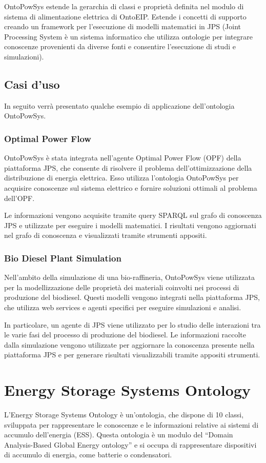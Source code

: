 OntoPowSys estende la gerarchia di classi e proprietà definita nel modulo di
sistema di alimentazione elettrica di OntoEIP. Estende
i concetti di supporto creando un framework per l'esecuzione di modelli
matematici in JPS (Joint Processing System è un sistema informatico che
utilizza ontologie per integrare conoscenze provenienti da diverse fonti e
consentire l'esecuzione di studi e simulazioni).

\subsection{Casi d'uso}
In seguito verrà presentato qualche esempio di applicazione dell'ontologia
OntoPowSys.

\subsubsection{Optimal Power Flow}
OntoPowSys è stata integrata nell'agente Optimal Power Flow (OPF) della
piattaforma JPS, che consente di risolvere il problema dell'ottimizzazione
della distribuzione di energia elettrica. Esso utilizza l'ontologia
OntoPowSys per acquisire conoscenze sul sistema elettrico e fornire soluzioni
ottimali al problema dell'OPF.

Le informazioni vengono acquisite tramite query
SPARQL sul grafo di conoscenza JPS e utilizzate per eseguire i modelli
matematici. I risultati vengono aggiornati nel grafo di conoscenza e
visualizzati tramite strumenti appositi.

\subsubsection{Bio Diesel Plant Simulation}
Nell'ambito della simulazione di una bio-raffineria, OntoPowSys viene
utilizzata per la modellizzazione delle proprietà dei materiali coinvolti nei
processi di produzione del biodiesel. Questi modelli vengono integrati nella
piattaforma JPS, che utilizza web services e agenti specifici per eseguire
simulazioni e analisi.

In particolare, un agente di JPS viene utilizzato per lo
studio delle interazioni tra le varie fasi del processo di produzione del
biodiesel. Le informazioni raccolte dalla simulazione vengono utilizzate per
aggiornare la conoscenza presente nella piattaforma JPS e per generare
risultati visualizzabili tramite appositi strumenti.

\section{Energy Storage Systems Ontology}
L'Energy Storage Systems Ontology \cite{EnergyStorageSystemOntology} è
un'ontologia, che dispone di 10 classi, sviluppata per
rappresentare le conoscenze e le informazioni relative ai sistemi di accumulo
dell'energia (ESS). Questa ontologia è un modulo del “Domain Analysis-Based
Global Energy ontology” e si occupa di rappresentare dispositivi di accumulo di
energia, come batterie o condensatori.

